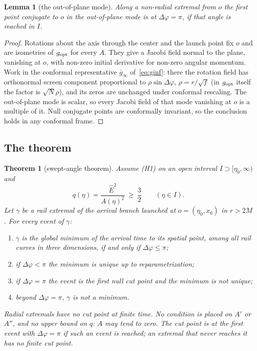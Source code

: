 \documentclass[aip,jmp,amsmath,amssymb,reprint]{revtex4-2}
\newcommand{\Ehat}{\hat E}
\newcommand{\gopt}{g_{\rm opt}}
\theoremstyle{plain}
\newtheorem{theorem}{Theorem}
\newtheorem{lemma}[proposition]{Lemma}
\theoremstyle{definition}
\begin{document}
\begin{lemma}[the out-of-plane mode]\label{lem:outofplane}
Along a non-radial extremal from $o$ the first point conjugate to $o$ in the
out-of-plane mode is at $\Delta\varphi=\pi$, if that angle is reached in $I$.
\end{lemma}

\begin{proof}
Rotations about the axis through the center and the launch point fix $o$ and are
isometries of $\gopt$ for every $A$. They give a Jacobi field normal to the plane,
vanishing at $o$, with non-zero initial derivative for non-zero angular momentum. Work in the
conformal representative $\bar g_\infty$ of~\eqref{eq:ginf}: there the rotation field has orthonormal screen component proportional
to $\rho\sin\Delta\varphi$, $\rho=r/\sqrt f$ (in $\gopt$ itself the factor is $\sqrt N\rho$), and its zeros
are unchanged under conformal rescaling. The out-of-plane mode is
scalar, so every Jacobi field of that mode vanishing at $o$ is a multiple of it. Null
conjugate points are conformally invariant, so the conclusion holds in any conformal
frame.
\end{proof}

\subsection{The theorem}
\label{sec:angle-thm}
\begin{theorem}[swept-angle theorem]\label{thm:angle}
Assume (H1) on an open interval $I\supset[\eta_0,\infty)$ and
\begin{equation}
  q(\eta)=\frac{\Ehat^2}{A(\eta)^2}\ \ge\ \frac32\qquad(\eta\in I).
  \label{eq:q32}
\end{equation}
Let $\gamma$ be a rail extremal of the arrival branch launched at $o=(\eta_0,x_0)$ in $r>2M$.
For every event of $\gamma$:
\begin{enumerate}
\item $\gamma$ is the global minimum of the arrival time to its spatial point, among all
  rail curves in three dimensions, if and only if $\Delta\varphi\le\pi$;
\item if $\Delta\varphi<\pi$ the minimum is unique up to reparametrization;
\item if $\Delta\varphi=\pi$ the event is the first null cut point and the minimum is not
  unique;
\item beyond $\Delta\varphi=\pi$, $\gamma$ is not a minimum.
\end{enumerate}
Radial extremals have no cut point at finite time. No condition is placed on $A'$ or $A''$,
and no upper bound on $q$: $A$ may tend to zero. The cut point is at the first event with
$\Delta\varphi=\pi$ if such an event is reached; an extremal that never reaches it has no finite
cut point.
\end{theorem}
\end{document}
